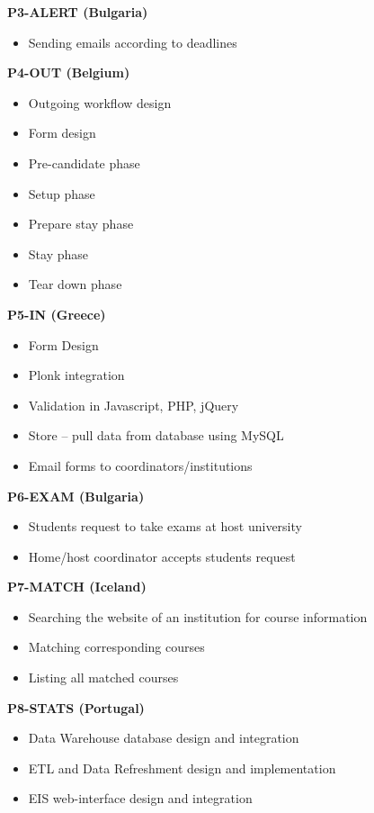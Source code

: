 \textbf{P3-ALERT (Bulgaria)}
\begin{itemize}
  \item Sending emails according to deadlines
\end{itemize}


\textbf{P4-OUT (Belgium)}
\begin{itemize}
  \item Outgoing workflow design
  \item Form design
  \item Pre-candidate phase
  \item Setup phase
  \item Prepare stay phase
  \item Stay phase
  \item Tear down phase
\end{itemize}


\textbf{P5-IN (Greece)}
\begin{itemize}
  \item Form Design
  \item Plonk integration
  \item Validation in Javascript, PHP, jQuery
  \item Store – pull data from database using MySQL
  \item Email forms to coordinators/institutions
\end{itemize}


\textbf{P6-EXAM (Bulgaria)}
\begin{itemize}
  \item Students request to take exams at host university
  \item Home/host coordinator accepts students request
\end{itemize}


\textbf{P7-MATCH (Iceland)}
\begin{itemize}
  \item Searching the website of an institution for course information
  \item Matching corresponding courses
  \item Listing all matched courses
\end{itemize}


\textbf{P8-STATS (Portugal)}
\begin{itemize}
  \item Data Warehouse database design and integration
  \item ETL and Data Refreshment design and implementation
  \item EIS web-interface design and integration
\end{itemize}

